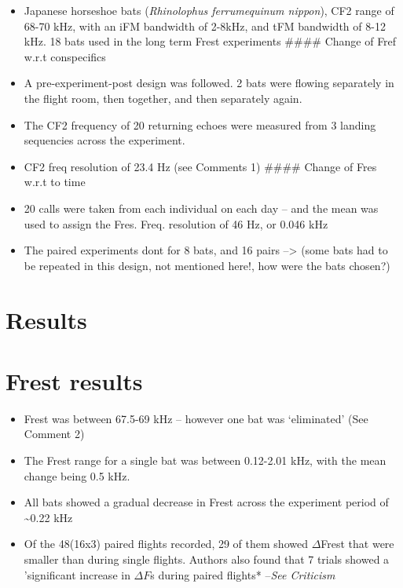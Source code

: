 \documentclass[
]{book}
\providecommand{\tightlist}{%
  \setlength{\itemsep}{0pt}\setlength{\parskip}{0pt}}
\begin{document}
\begin{itemize}
\tightlist
\item
  Japanese horseshoe bats (\emph{Rhinolophus ferrumequinum nippon}), CF2 range of 68-70 kHz, with an iFM bandwidth of 2-8kHz, and tFM bandwidth of 8-12 kHz. 18 bats used in the long term Frest experiments
  \#\#\#\# Change of Fref w.r.t conspecifics
\item
  A pre-experiment-post design was followed. 2 bats were flowing separately in the flight room, then together, and then separately again.
\item
  The CF2 frequency of 20 returning echoes were measured from 3 landing sequencies across the experiment.
\item
  CF2 freq resolution of 23.4 Hz (see Comments 1)
  \#\#\#\# Change of Fres w.r.t to time
\item
  20 calls were taken from each individual on each day -- and the mean was used to assign the Fres. Freq. resolution of 46 Hz, or 0.046 kHz
\item
  The paired experiments dont for 8 bats, and 16 pairs --\textgreater{} (some bats had to be repeated in this design, not mentioned here!, how were the bats chosen?)
\end{itemize}

\hypertarget{results-13}{%
\section{Results}\label{results-13}}

\hypertarget{frest-results}{%
\section{Frest results}\label{frest-results}}

\begin{itemize}
\tightlist
\item
  Frest was between 67.5-69 kHz -- however one bat was `eliminated' (See Comment 2)
\item
  The Frest range for a single bat was between 0.12-2.01 kHz, with the mean change being 0.5 kHz.
\item
  All bats showed a gradual decrease in Frest across the experiment period of \textasciitilde0.22 kHz
\item
  Of the 48(16x3) paired flights recorded, 29 of them showed \(\Delta\)Frest that were smaller than during single flights. Authors also found that 7 trials showed a 'significant increase in \(\Delta F\)s during paired flights* --\emph{See Criticism}
\end{itemize}
\end{document}
